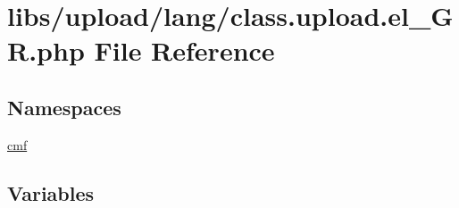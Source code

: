 \hypertarget{class_8upload_8el___g_r_8php}{}\section{libs/upload/lang/class.upload.\+el\+\_\+\+G\+R.\+php File Reference}
\label{class_8upload_8el___g_r_8php}
\subsection*{Namespaces}
\begin{DoxyCompactItemize}
\item 
 \hyperlink{namespacecmf}{cmf}
\end{DoxyCompactItemize}
\subsection*{Variables}
